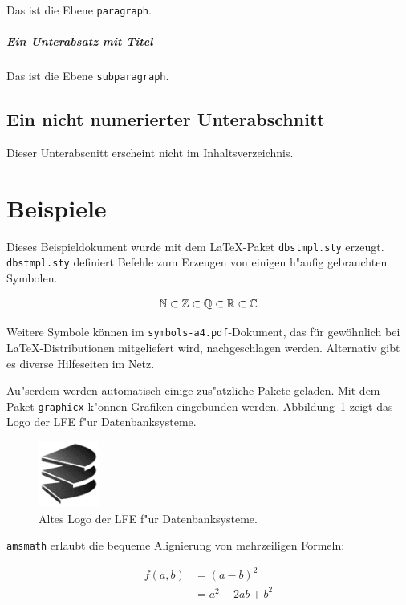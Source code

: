 \documentclass[pdftex,12pt,a4paper]{report}
\begin{document}
Das ist die Ebene {\tt paragraph}.

\subparagraph{Ein Unterabsatz mit Titel}

Das ist die Ebene {\tt subparagraph}.

\subsection*{Ein nicht numerierter Unterabschnitt}

Dieser Unterabscnitt erscheint nicht im Inhaltsverzeichnis.

\section{Beispiele}
Dieses Beispieldokument wurde mit dem \LaTeX-Paket {\tt dbstmpl.sty} erzeugt.
{\tt dbstmpl.sty} definiert Befehle zum Erzeugen von einigen
h"aufig gebrauchten Symbolen.

\begin{align}
  \mathbb{N} \subset \mathbb{Z} \subset \mathbb{Q} \subset \mathbb{R} \subset \mathbb{C}
\end{align}

Weitere Symbole k\"onnen im {\tt symbols-a4.pdf}-Dokument, das f\"ur
gew\"ohnlich bei \LaTeX-Distributionen mitgeliefert wird, nachgeschlagen
werden. Alternativ gibt es diverse Hilfeseiten im Netz.

Au"serdem werden automatisch einige zus"atzliche Pakete geladen.
Mit dem Paket {\tt graphicx} k"onnen Grafiken eingebunden werden.
Abbildung~\ref{fig:dbslogo} zeigt das Logo der LFE f"ur Datenbanksysteme.

\begin{figure}
  \begin{center}
    \includegraphics[width=2cm]{logo-dbs.png}
  \end{center}
  \caption{Altes Logo der LFE f"ur Datenbanksysteme.
    \label{fig:dbslogo} %
  }
\end{figure}

{\tt amsmath} erlaubt die bequeme Alignierung von mehrzeiligen Formeln:

\begin{align}
  f(a,b) &= (a-b)^2 \label{eq:aMinusbSq}\\
    &= a^2 - 2 a b + b^2 \label{eq:aMinusbSqResolved}
\end{align}
\end{document}
